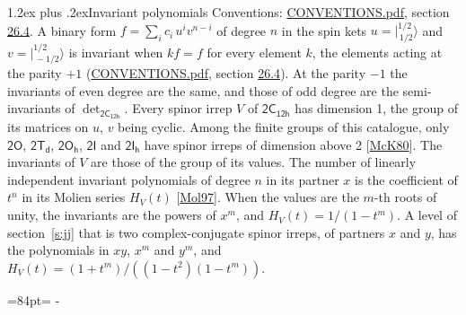 \documentclass[10pt,a4paper]{article}
\makeatletter
\renewcommand\section{\@startsection{section}{1}{\z@}{-3ex plus -1ex minus -.2ex}%
  {1.2ex plus .2ex}{\normalfont\large\sffamily\bfseries\color{parttitle}}}
\newcommand{\needspace}[1]{\par\penalty-100\begingroup\dimen0=#1\relax\dimen2=\pagegoal
  \advance\dimen2-\pagetotal\ifdim\dimen0>\dimen2\relax\ifdim\dimen2>0pt\vfil\break\fi\fi
  \endgroup}
\numberwithin{equation}{section}
\newcommand{\grp}[1]{\mathsf{#1}}
\newcommand{\jm}[2]{\bigl\lvert{}^{#1}_{\,#2}\bigr\rangle}
\makeatother
\begin{document}
\section{Invariant polynomials}\label{s:invariants}
Conventions: \href{../../CONVENTIONS.pdf}{CONVENTIONS.pdf}, section \href{../../CONVENTIONS.pdf\#conv.26.4}{26.4}.
\leavevmode\label{n:local.binary.form}A binary form $f = \sum_i c_i\, u^i v^{n-i}$ of degree $n$ in the spin kets $u = \jm{1/2}{1/2}$ and $v = \jm{1/2}{-1/2}$ is invariant when $k f = f$ for every element $k$, the elements acting at the parity $+1$ (\href{../../CONVENTIONS.pdf}{CONVENTIONS.pdf}, section \href{../../CONVENTIONS.pdf\#conv.26.4}{26.4}). At the parity $-1$ the invariants of even degree are the same, and those of odd degree are the semi-invariants of $\det_{\grp{2C_{12h}}}$.
\leavevmode\label{n:function.hilbert}Every spinor irrep $V$ of $\grp{2C_{12h}}$ has dimension 1, the group of its matrices on $u$, $v$ being cyclic. Among the finite groups of this catalogue, only $\grp{2O}$, $\grp{2T_{d}}$, $\grp{2O_{h}}$, $\grp{2I}$ and $\grp{2I_{h}}$ have spinor irreps of dimension above 2 [\href{../../../REFERENCES.pdf\#ref.McK80}{McK80}]. The invariants of $V$ are those of the group of its values. \label{n:local.partner.x}The number of linearly independent invariant polynomials of degree $n$ in its partner $x$ is the coefficient of $t^n$ in its Molien series $H_V(t)$ [\href{../../../REFERENCES.pdf\#ref.Mol97}{Mol97}]. When the values are the $m$-th roots of unity, the invariants are the powers of $x^{m}$, and $H_V(t) = 1/(1 - t^{m})$. A level of section~\ref{s:jj} that is two complex-conjugate spinor irreps, of partners $x$ and $y$, has the polynomials in $xy$, $x^{m}$ and $y^{m}$, and $H_V(t) = (1 + t^{m})/((1 - t^{2})(1 - t^{m}))$.
\needspace{84pt}
\end{document}
